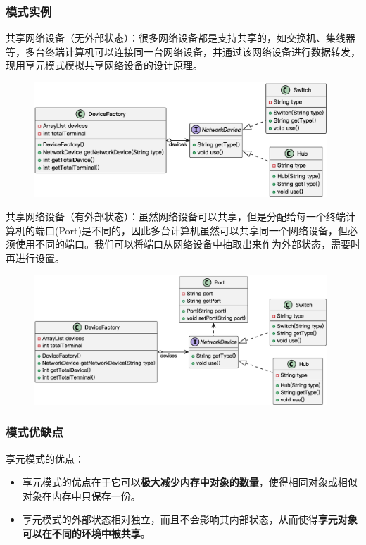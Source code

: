 \subsubsection{模式实例}
共享网络设备（无外部状态）：很多网络设备都是支持共享的，如交换机、集线器等，多台终端计算机可以连接同一台网络设备，并通过该网络设备进行数据转发，现用享元模式模拟共享网络设备的设计原理。
\begin{figure}[H]
    \vspace{-0.5em}
	\centering
	\includegraphics[width=0.98\textwidth]{images/享元模式实例1.eps}
    \vspace{-1em}
\end{figure}

共享网络设备（有外部状态）：虽然网络设备可以共享，但是分配给每一个终端计算机的端口(Port)是不同的，因此多台计算机虽然可以共享同一个网络设备，但必须使用不同的端口。我们可以将端口从网络设备中抽取出来作为外部状态，需要时再进行设置。
\begin{figure}[H]
    \vspace{-0.5em}
	\centering
	\includegraphics[width=0.98\textwidth]{images/享元模式实例2.eps}
    \vspace{-1em}
\end{figure}

\subsubsection{模式优缺点}
享元模式的优点：
\begin{itemize}
    \item 享元模式的优点在于它可以\textbf{极大减少内存中对象的数量}，使得相同对象或相似对象在内存中只保存一份。
    \item 享元模式的外部状态相对独立，而且不会影响其内部状态，从而使得\textbf{享元对象可以在不同的环境中被共享}。
\end{itemize}

